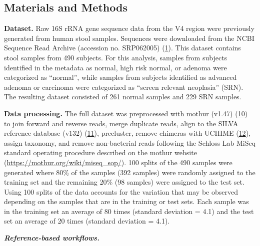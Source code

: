 \documentclass[
]{article}
\begin{document}
\hypertarget{materials-and-methods}{%
\subsection{Materials and Methods}\label{materials-and-methods}}

\textbf{Dataset.} Raw 16S rRNA gene sequence data from the V4 region
were previously generated from human stool samples. Sequences were
downloaded from the NCBI Sequence Read Archive (accession no. SRP062005)
(\protect\hyperlink{ref-baxter2016}{1}). This dataset contains stool
samples from 490 subjects. For this analysis, samples from subjects
identified in the metadata as normal, high risk normal, or adenoma were
categorized as ``normal'', while samples from subjects identified as
advanced adenoma or carcinoma were categorized as ``screen relevant
neoplasia'' (SRN). The resulting dataset consisted of 261 normal samples
and 229 SRN samples.

\textbf{Data processing.} The full dataset was preprocessed with mothur
(v1.47) (\protect\hyperlink{ref-schloss2009}{10}) to join forward and
reverse reads, merge duplicate reads, align to the SILVA reference
database (v132) (\protect\hyperlink{ref-quast2013}{11}), precluster,
remove chimeras with UCHIME (\protect\hyperlink{ref-edgar2011}{12}),
assign taxonomy, and remove non-bacterial reads following the Schloss
Lab MiSeq standard operating procedure described on the mothur website
(\url{https://mothur.org/wiki/miseq_sop/}). 100 splits of the 490
samples were generated where 80\% of the samples (392 samples) were
randomly assigned to the training set and the remaining 20\% (98
samples) were assigned to the test set. Using 100 splits of the data
accounts for the variation that may be observed depending on the samples
that are in the training or test sets. Each sample was in the training
set an average of 80 times (standard deviation = 4.1) and the test set
an average of 20 times (standard deviation = 4.1).

\textbf{\emph{Reference-based workflows.}}
\end{document}
